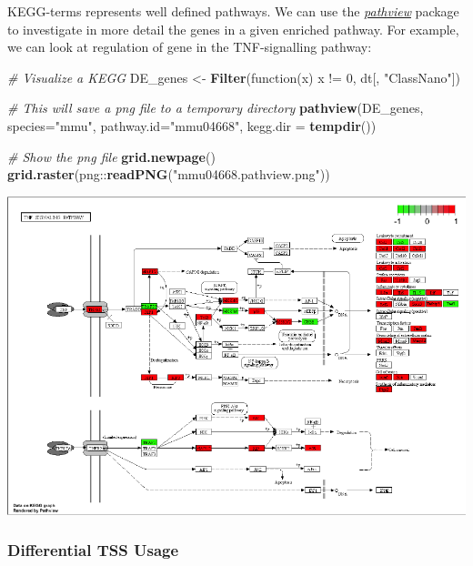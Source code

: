 \documentclass[9pt,a4paper,]{extarticle}
\newenvironment{Shaded}{\begin{snugshade}}{\end{snugshade}}
\newcommand{\KeywordTok}[1]{\textcolor[rgb]{0.13,0.29,0.53}{\textbf{{#1}}}}
\newcommand{\DataTypeTok}[1]{\textcolor[rgb]{0.13,0.29,0.53}{{#1}}}
\newcommand{\DecValTok}[1]{\textcolor[rgb]{0.00,0.00,0.81}{{#1}}}
\newcommand{\StringTok}[1]{\textcolor[rgb]{0.31,0.60,0.02}{{#1}}}
\newcommand{\CommentTok}[1]{\textcolor[rgb]{0.56,0.35,0.01}{\textit{{#1}}}}
\newcommand{\NormalTok}[1]{{#1}}
\begin{document}
KEGG-terms represents well defined pathways. We can use the \emph{\href{https://bioconductor.org/packages/3.8/pathview}{pathview}} package\citep{Luo2013} to investigate in more detail the genes in a given enriched pathway. For example, we can look at regulation of gene in the TNF-signalling pathway:

\begin{Shaded}
\begin{Highlighting}[]
\CommentTok{# Visualize a KEGG}
\NormalTok{DE_genes <-}\StringTok{ }\KeywordTok{Filter}\NormalTok{(function(x) x !=}\StringTok{ }\DecValTok{0}\NormalTok{, dt[, }\StringTok{"ClassNano"}\NormalTok{])}

\CommentTok{# This will save a png file to a temporary directory}
\KeywordTok{pathview}\NormalTok{(DE_genes, }\DataTypeTok{species=}\StringTok{"mmu"}\NormalTok{, }\DataTypeTok{pathway.id=}\StringTok{"mmu04668"}\NormalTok{, }\DataTypeTok{kegg.dir =} \KeywordTok{tempdir}\NormalTok{())}

\CommentTok{# Show the png file}
\KeywordTok{grid.newpage}\NormalTok{()}
\KeywordTok{grid.raster}\NormalTok{(png::}\KeywordTok{readPNG}\NormalTok{(}\StringTok{"mmu04668.pathview.png"}\NormalTok{))}
\end{Highlighting}
\end{Shaded}

\begin{center}\includegraphics{CAGEWorkflow_files/figure-latex/pathview-1} \end{center}

\subsubsection{Differential TSS Usage}\label{differential-tss-usage}
\end{document}
